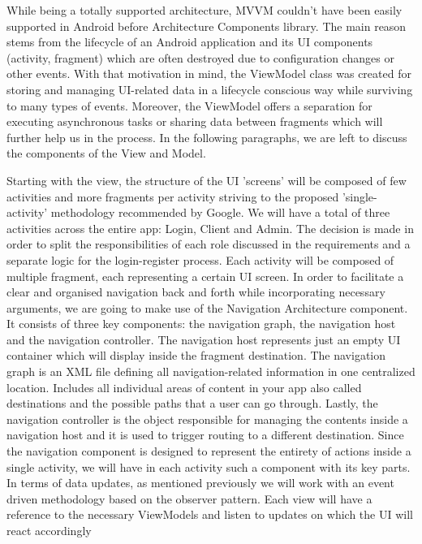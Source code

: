 While being a totally supported architecture, MVVM couldn't have been easily supported in Android before Architecture Components library. The main reason stems from the lifecycle of an Android application and its UI components (activity, fragment) which are often destroyed due to configuration changes or other events. With that motivation in mind, the ViewModel class was created for storing and managing UI-related data in a lifecycle conscious way while surviving to many types of events. Moreover, the ViewModel offers a separation for executing asynchronous tasks or sharing data between fragments which will further help us in the process. In the following paragraphs, we are left to discuss the components of the View and Model.

Starting with the view, the structure of the UI 'screens' will be composed of few activities and more fragments per activity striving to the proposed 'single-activity' methodology recommended by Google. We will have a total of three activities across the entire app: Login, Client and Admin. The decision is made in order to split the responsibilities of each role discussed in the requirements and a separate logic for the login-register process. Each activity will be composed of multiple fragment, each representing a certain UI screen. In order to facilitate a clear and organised navigation back and forth while incorporating necessary arguments, we are going to make use of the Navigation Architecture component. It consists of three key components: the navigation graph, the navigation host and the navigation controller. The navigation host represents just an empty UI container which will display inside the fragment destination. The navigation graph is an XML file defining all navigation-related information in one centralized location. Includes all individual areas of content in your app also called destinations and the possible paths that a user can go through. Lastly, the navigation controller is the object responsible for managing the contents inside a navigation host and it is used to trigger routing to a different destination. Since the navigation component is designed to represent the entirety of actions inside a single activity, we will have in each activity such a component with its key parts. In terms of data updates, as mentioned previously we will work with an event driven methodology based on the observer pattern. Each view will have a reference to the necessary ViewModels and listen to updates on which the UI will react accordingly

